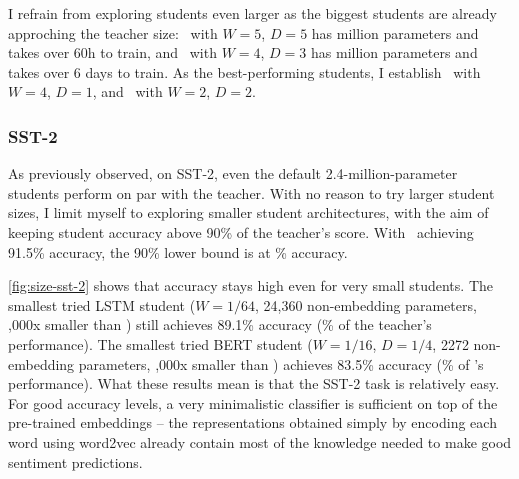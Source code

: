 {{{      I refrain from exploring students even larger as the biggest students are already approching the teacher size: \LSTMS~with $W=5$, $D=5$ has  million parameters and takes over 60h to train, and \BERTS~with $W=4$, $D=3$ has  million parameters and takes over 6 days to train.
      As the best-performing students, I establish \BERTS~with $W=4$, $D=1$, and \LSTMS~with $W=2$, $D=2$.
    }

    \subsubsection{SST-2}{
      As previously observed, on SST-2, even the default 2.4-million-parameter students perform on par with the teacher. With no reason to try larger student sizes, I limit myself to exploring smaller student architectures, with the aim of keeping student accuracy above 90\% of the teacher's score. With \BERTT~achieving 91.5\% accuracy, the 90\% lower bound is at \% accuracy.

      \autoref{fig:size-sst-2} shows that accuracy stays high even for very small students. 
      The smallest tried LSTM student ($W=1/64$, 24,360 non-embedding parameters, ,000x smaller than \BERTT) still achieves 89.1\% accuracy (\% of the teacher's performance).
      The smallest tried BERT student ($W=1/16$, $D=1/4$, 2272 non-embedding parameters, ,000x smaller than \BERTT) achieves 83.5\% accuracy (\% of \BERTT's performance).
      What these results mean is that the SST-2 task is relatively easy. 
      For good accuracy levels, a very minimalistic classifier is sufficient on top of the pre-trained embeddings -- the representations obtained simply by encoding each word using word2vec already contain most of the knowledge needed to make good sentiment predictions.

}}}
